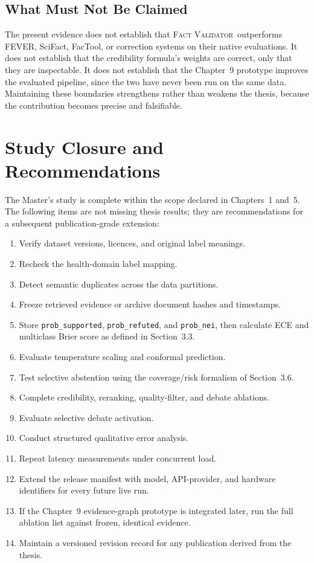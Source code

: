 \documentclass[12pt,a4paper,openany]{report}
\newcommand{\system}{\textsc{Fact Validator}}
\begin{document}
\section{What Must Not Be Claimed}
The present evidence does not establish that \system\ outperforms FEVER, SciFact, FacTool, or correction systems on their native evaluations. It does not establish that the credibility formula's weights are correct, only that they are inspectable. It does not establish that the Chapter~9 prototype improves the evaluated pipeline, since the two have never been run on the same data. Maintaining these boundaries strengthens rather than weakens the thesis, because the contribution becomes precise and falsifiable.

\chapter{Study Closure and Recommendations}
The Master's study is complete within the scope declared in Chapters~1 and~5.
The following items are not missing thesis results; they are recommendations
for a subsequent publication-grade extension:
\begin{enumerate}
  \item Verify dataset versions, licences, and original label meanings.
  \item Recheck the health-domain label mapping.
  \item Detect semantic duplicates across the data partitions.
  \item Freeze retrieved evidence or archive document hashes and timestamps.
  \item Store \texttt{prob\_supported}, \texttt{prob\_refuted}, and \texttt{prob\_nei}, then calculate ECE and multiclass Brier score as defined in Section~3.3.
  \item Evaluate temperature scaling and conformal prediction.
  \item Test selective abstention using the coverage/risk formalism of Section~3.6.
  \item Complete credibility, reranking, quality-filter, and debate ablations.
  \item Evaluate selective debate activation.
  \item Conduct structured qualitative error analysis.
  \item Repeat latency measurements under concurrent load.
  \item Extend the release manifest with model, API-provider, and hardware identifiers for every future live run.
  \item If the Chapter~9 evidence-graph prototype is integrated later, run the full ablation list against frozen, identical evidence.
  \item Maintain a versioned revision record for any publication derived from the thesis.
\end{enumerate}
\end{document}
